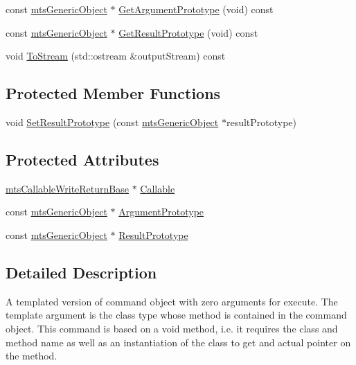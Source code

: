 \begin{DoxyCompactItemize}
\item 
const \hyperlink{classmts_generic_object}{mts\+Generic\+Object} $\ast$ \hyperlink{classmts_command_write_return_a6332f4612d821a195472d4a36be4303f}{Get\+Argument\+Prototype} (void) const 
\item 
const \hyperlink{classmts_generic_object}{mts\+Generic\+Object} $\ast$ \hyperlink{classmts_command_write_return_aab5e107d3cd4837b8820e91089b38400}{Get\+Result\+Prototype} (void) const 
\item 
void \hyperlink{classmts_command_write_return_a6e30a4119ea2ef2466c0f3b46479cc3e}{To\+Stream} (std\+::ostream \&output\+Stream) const 
\end{DoxyCompactItemize}
\subsection*{Protected Member Functions}
\begin{DoxyCompactItemize}
\item 
void \hyperlink{classmts_command_write_return_a23691915a84b24a9eb08e75ed8b347c2}{Set\+Result\+Prototype} (const \hyperlink{classmts_generic_object}{mts\+Generic\+Object} $\ast$result\+Prototype)
\end{DoxyCompactItemize}
\subsection*{Protected Attributes}
\begin{DoxyCompactItemize}
\item 
\hyperlink{classmts_callable_write_return_base}{mts\+Callable\+Write\+Return\+Base} $\ast$ \hyperlink{classmts_command_write_return_ada842b5e68290a2c53de66702025f4ab}{Callable}
\item 
const \hyperlink{classmts_generic_object}{mts\+Generic\+Object} $\ast$ \hyperlink{classmts_command_write_return_a21b712fb9036e3dfad2d67c5f15932d2}{Argument\+Prototype}
\item 
const \hyperlink{classmts_generic_object}{mts\+Generic\+Object} $\ast$ \hyperlink{classmts_command_write_return_a02ec49cd66e7d95bd1ac9d08e5eb8cae}{Result\+Prototype}
\end{DoxyCompactItemize}


\subsection{Detailed Description}
A templated version of command object with zero arguments for execute. The template argument is the class type whose method is contained in the command object. This command is based on a void method, i.\+e. it requires the class and method name as well as an instantiation of the class to get and actual pointer on the method. 

